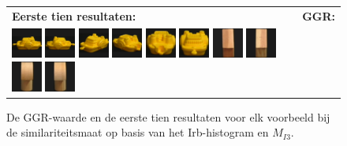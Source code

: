 \begin{figure}[bp]
\caption{\label{fig:results_irb_histgeb}De GGR-waarde en de eerste tien resultaten voor elk voorbeeld bij de similariteitsmaat op basis van het Irb-histogram en $M_{I3}$.}
\vspace{5pt}
\centering
\begin{tabular}{m{11cm} | m{3cm} |}
\textbf{Eerste tien resultaten:} & \textbf{GGR:} \\
\vspace{4pt}
\includegraphics[width=1cm]{coil/beeld-12.eps}
\includegraphics[width=1cm]{coil/beeld-13.eps}
\includegraphics[width=1cm]{coil/beeld-15.eps}
\includegraphics[width=1cm]{coil/beeld-16.eps}
\includegraphics[width=1cm]{coil/beeld-17.eps}
\includegraphics[width=1cm]{coil/beeld-14.eps}
\includegraphics[width=1cm]{coil/beeld-44.eps}
\includegraphics[width=1cm]{coil/beeld-47.eps}
\includegraphics[width=1cm]{coil/beeld-5.eps}
\includegraphics[width=1cm]{coil/beeld-2.eps}

\end{tabular}
\end{figure}
